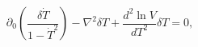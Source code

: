 \begin{equation}\label{dte}
\partial_0\left( \frac{\delta \dot T}{1-\dot T^2} \right) 
        - \nabla^2 \delta T 
+\frac{d^2\ln V}{dT^2} \delta T = 0,
\end{equation}

